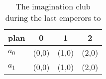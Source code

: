 \documentclass[a4paper]{article}
\begin{document}
\begin{table}
\begin{adjustbox}{width=0.6\columnwidth}
\begin{tabular}{|l|l|l|l|}
\hline
\textbf{plan} & \multicolumn{1}{c|}{\textbf{0}} & \multicolumn{1}{c|}{\textbf{1}} & \multicolumn{1}{c|}{\textbf{2}} \\ \hline
\textbf{$a_0$}  & (0,0) & (1,0) & (2,0) \\ \hline
\textbf{$a_1$}  & (0,0) & (1,0) & (2,0) \\ \hline
\end{tabular}
\end{adjustbox}
\caption{The imagination club during the last emperors to 
}
\end{table}
\end{document}
